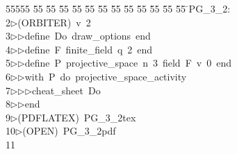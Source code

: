 %
%
\begin{tabbing}
55555 \= 55 \= 55 \= 55 \= 55 \= 55 \= 55 \= 55 \= 55 \= 55 \= 55 \= 55 \= 55 \= \>PG\_3\_2:\\[0pt]
2\>$\triangleright$\>(ORBITER)\ v\ 2\ \\[0pt]
3\>$\triangleright$\>$\triangleright$\>define\ Do\ draw\_options\ end\ \\[0pt]
4\>$\triangleright$\>$\triangleright$\>define\ F\ finite\_field\ q\ 2\ end\ \\[0pt]
5\>$\triangleright$\>$\triangleright$\>define\ P\ projective\_space\ n\ 3\ field\ F\ v\ 0\ end\ \\[0pt]
6\>$\triangleright$\>$\triangleright$\>with\ P\ do\ projective\_space\_activity\ \\[0pt]
7\>$\triangleright$\>$\triangleright$\>$\triangleright$\>cheat\_sheet\ Do\ \\[0pt]
8\>$\triangleright$\>$\triangleright$\>end\\[0pt]
9\>$\triangleright$\>(PDFLATEX)\ PG\_3\_2tex\ \\[0pt]
10\>$\triangleright$\>(OPEN)\ PG\_3\_2pdf\\[0pt]
11\>\end{tabbing}
